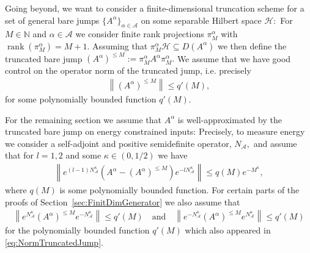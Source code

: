 \documentclass[11pt]{amsart}
\newcommand{\1}{\mathbbm{1}}
\newcommand{\kb}[1]{|#1\rangle\!\langle#1|}
\newcommand{\N}{\mathbb{N}}
\newcommand{\cH}{\mathcal{H}}
\newcommand{\NA}{N_{\mathcal{A}}}
\newcommand{\cA}{\mathcal{A}}
\newcommand{\bin}[1]{}
\theoremstyle{plain}
\theoremstyle{definition}
\theoremstyle{remark}
\numberwithin{equation}{section}
\begin{document}
Going beyond, we want to consider a finite-dimensional truncation scheme for a set of general bare jumps $\{A^\alpha\}_{\alpha\in\mathcal{A}}$ on some separable Hilbert space $\cH:$ \bin{For that let $\{N_\alpha\}_{\alpha \in\cA}$  be a set of self-adjoint operators with $N_\alpha\ge 0$ and having discrete spectrum and eigenvectors $\left(\ket{\nu^\alpha_n}\right)_{n\in \N_0}.$ For $M\in \N$ consider the spectral projection   $\pi^{\alpha}_M =\sum_{n=0}^M \kb{\nu^{\alpha}_n}$ and, assuming that $\pi^{\alpha}_M\cH\subseteq D(A^{\alpha}),$  the truncated bare jump $\left(A^{\alpha}\right)^{\le M} = \pi^{\alpha}_M A^{\alpha}\pi^{\alpha}_M.$ We also assume that we have good control on the operator norm of the truncated jump, i.e. precisely}
 For $M\in \N$ and $\alpha\in\cA$ we consider finite rank projections $\pi^{\alpha}_M$ with $\operatorname{rank}(\pi^{\alpha}_M) =M+1. $ Assuming that $\pi^{\alpha}_M\cH\subseteq D(A^{\alpha})$ we then define the truncated bare jump $\left(A^{\alpha}\right)^{\le M} := \pi^{\alpha}_M A^{\alpha}\pi^{\alpha}_M.$ We assume that we have good control on the operator norm of the truncated jump, i.e. precisely 
\begin{align}
\label{eq:NormTruncatedJump}
    \left\|(A^\alpha)^{\le M}\right\| \le q'(M),
\end{align}
for some polynomially bounded function $q'(M).$ 

    For the remaining section we assume that $A^{\alpha}$ is well-approximated by the truncated bare jump on energy constrained inputs: Precisely, to measure energy we consider a self-adjoint and positive semidefinite operator, $\NA,$ and assume that for $l=1,2$ and some $\kappa\in(0,1/2)$ we have
\begin{align}
\label{eq:AbstractFiniteTruncBareJumps}  
    \left\|e^{(l-1)\NA^{\kappa}}(A^{\alpha}-(A^{\alpha})^{\le M})e^{-l\NA^{\kappa}}\right\| \le q(M)e^{-M^{\kappa}},\bin{ \quad  \left\|e^{(k-1)\NA}((A^{\alpha})^\dagger-\left((A^{\alpha})^{\dagger}\right)^{\le M})e^{-k\NA^{\kappa}}\right\| \le q(M)e^{-M^{\kappa}}, }
\end{align}
where $q(M)$ is some polynomially bounded function. \bin{ $N_{\mathcal{A}} =\frac{1}{2} \sum_{\alpha\in\mathcal{A}} N_\alpha.$} For certain parts of the proofs of Section~\ref{sec:FinitDimGenerator} we also assume that
\begin{align}
\label{eq:NormTruncatedJump2}
\left\|e^{\NA^{\kappa}}(A^{\alpha})^{\le M} e^{-\NA^{\kappa}}\right\| \le q'(M)\quad\text{and}\quad\left\|e^{-\NA^{\kappa}}(A^{\alpha})^{\le M} e^{\NA^{\kappa}}\right\| \le q'(M)
\end{align}
for the polynomially bounded function $q'(M)$ which also appeared in \eqref{eq:NormTruncatedJump}.
\end{document}
